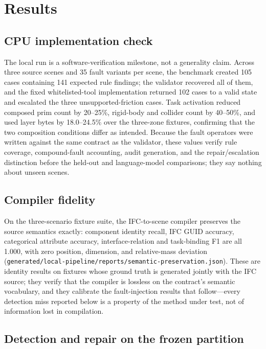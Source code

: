 \section{Results}
\label{sec:results}

\subsection{CPU implementation check}

The local run is a software-verification milestone, not a generality claim.
Across three source scenes and 35 fault variants per scene, the benchmark
created 105 cases containing 141 expected rule findings; the validator
recovered all of them, and the fixed whitelisted-tool implementation
returned 102 cases to a valid state and escalated the three
unsupported-friction cases. Task activation reduced composed prim count by
20--25\%, rigid-body and collider count by 40--50\%, and used layer bytes by
18.0--24.5\% over the three-zone fixtures, confirming that the two
composition conditions differ as intended. Because the fault operators were
written against the same contract as the validator, these values verify rule
coverage, compound-fault accounting, audit generation, and the
repair/escalation distinction before the held-out and language-model
comparisons; they say nothing about unseen scenes.

\subsection{Compiler fidelity}

On the three-scenario fixture suite, the IFC-to-scene compiler preserves the
source semantics exactly: component identity recall, IFC GUID accuracy,
categorical attribute accuracy, interface-relation and task-binding F1 are all
1.000, with zero position, dimension, and relative-mass deviation
(\texttt{generated/local-pipeline/reports/semantic-preservation.json}). These
are identity results on fixtures whose ground truth is generated jointly with
the IFC source; they verify that the compiler is lossless on the contract's
semantic vocabulary, and they calibrate the fault-injection results that
follow---every detection miss reported below is a property of the method under
test, not of information lost in compilation.



\subsection{Detection and repair on the frozen partition}
\label{sec:detection-repair}

